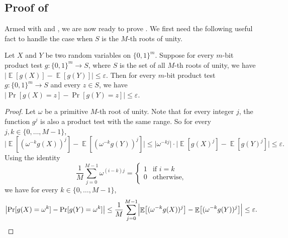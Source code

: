 \documentclass{toc}
\newcommand{\zo}{\{0,1\}}
\def\eps{\varepsilon}
\DeclareMathOperator*{\E}{\mathbb{E}}                 %
\begin{document}
  \subsection{Proof of }
  Armed with  and , we are now ready to prove .
  We first need the following useful fact to handle the case when $S$ is the $M$-th roots of unity.
  \begin{fact} \label{fact:modM-to-B}
  Let $X$ and $Y$ be two random variables on $\zo^m$.
  Suppose for every
  $m$-bit  %
  product test $g\colon \zo^m \to S$, where $S$ is the set of all $M$-th roots of unity, we have
  $\bigl| \E[g(X)] - \E[g(Y)] \bigr| \le \eps$. Then for every 
  $m$-bit  %
  product test $g\colon \zo^m \to S$ and every $z \in S$, we have $\bigl| \Pr[g(X) = z] - \Pr[g(Y) = z] \bigr| \le \eps$.
  \end{fact}
  \begin{proof}
    Let $\omega$ be a primitive $M$-th root of unity.
    Note that for every integer $j$, the function $g^j$ is also a product test with the same range.
    So for every $j, k \in \{0, \ldots, M-1\}$,
    \[
      \bigl| \E[ (\omega^{-k} g(X))^j] - \E[ (\omega^{-k} g(Y))^j] \bigr|
      \le \bigl| \omega^{-kj} \bigr| \cdot \bigl| \E[ g(X)^j ] - \E[ g(Y)^j ] \bigr|
      \le \eps .
    \]
    Using the identity
    \[
      \frac{1}{M} \sum_{j=0}^{M-1} \omega^{(i-k)j} = \begin{cases} 1 & \text{if $i = k$} \\ 0 & \text{otherwise,} \end{cases}
    \]
    we have for every $k \in \{0, \ldots, M-1\}$,
    \[
      \bigl| \Pr[g(X) = \omega^k] - \Pr[g(Y) = \omega^k] \bigr|
      \le \frac{1}{M} \sum_{j=0}^{M-1} \Bigl| \E \bigl[ (\omega^{-k} g(X))^j \bigr] - \E \bigl[ (\omega^{-k} g(Y))^j \bigr] \Bigr| \\
      \le \eps . \qedhere
    \]
  \end{proof}
\end{document}

